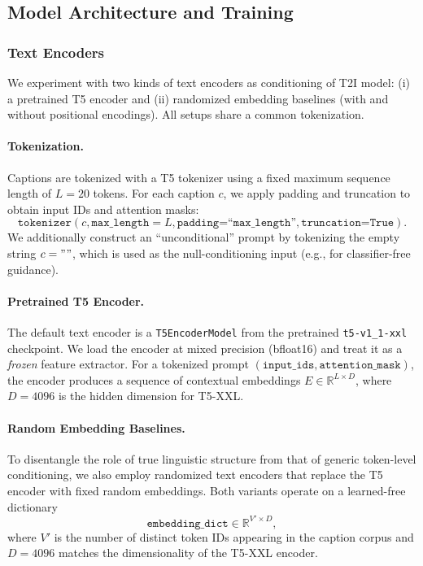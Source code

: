\documentclass[10pt,twocolumn,letterpaper]{article}
\begin{document}
\subsection{Model Architecture and Training}\label{method:model_arch}



\subsubsection{Text Encoders}
We experiment with two kinds of text encoders as conditioning of T2I model: (i) a pretrained T5 encoder and (ii) randomized embedding baselines (with and without positional encodings). 
All setups share a common tokenization.

\paragraph{Tokenization.}
Captions are tokenized with a T5 tokenizer using a fixed maximum sequence length of $L=20$ tokens. For each caption $c$, we apply padding and truncation to obtain input IDs and attention masks:
\[
\texttt{tokenizer}(c, \texttt{max\_length}=L, \texttt{padding=``max\_length''}, \texttt{truncation=True}).
\]
We additionally construct an ``unconditional'' prompt by tokenizing the empty string $c = ""$, which is used as the null-conditioning input (e.g., for classifier-free guidance). %

\paragraph{Pretrained T5 Encoder.}
The default text encoder is a \texttt{T5EncoderModel} from the pretrained \texttt{t5-v1\_1-xxl} checkpoint. We load the encoder at mixed precision (bfloat16) and treat it as a \textit{frozen} feature extractor. For a tokenized prompt $(\texttt{input\_ids}, \texttt{attention\_mask})$, the encoder produces a sequence of contextual embeddings
$E \in \mathbb{R}^{L \times D}$,
where $D=4096$ is the hidden dimension for T5-XXL. %

\paragraph{Random Embedding Baselines.}
To disentangle the role of true linguistic structure from that of generic token-level conditioning, we also employ randomized text encoders that replace the T5 encoder with fixed random embeddings. Both variants operate on a learned-free dictionary
\[
\texttt{embedding\_dict} \in \mathbb{R}^{V' \times D},
\]
where $V'$ is the number of distinct token IDs appearing in the caption corpus and $D=4096$ matches the dimensionality of the T5-XXL encoder.
\end{document}

